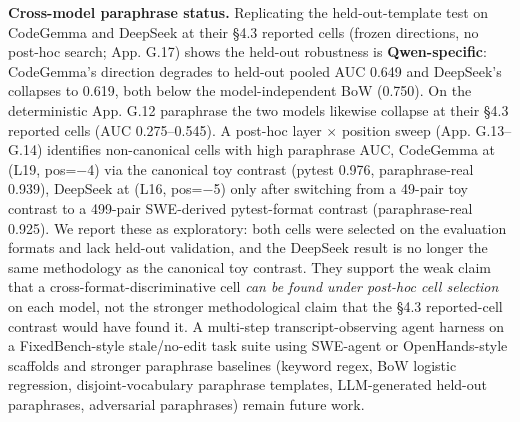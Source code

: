 \documentclass[
  11pt,
  a4paper]{article}
\begin{document}
\textbf{Cross-model paraphrase status.} Replicating the
held-out-template test on CodeGemma and DeepSeek at their \S{}4.3 reported
cells (frozen directions, no post-hoc search; App. G.17) shows the
held-out robustness is \textbf{Qwen-specific}: CodeGemma's direction
degrades to held-out pooled AUC 0.649 and DeepSeek's collapses to 0.619,
both below the model-independent BoW (0.750). On the deterministic App.
G.12 paraphrase the two models likewise collapse at their \S{}4.3 reported
cells (AUC 0.275--0.545). A post-hoc layer \ensuremath{\times} position sweep (App.
G.13--G.14) identifies non-canonical cells with high paraphrase AUC,
CodeGemma at (L19, pos=\ensuremath{-}4) via the canonical toy contrast (pytest 0.976,
paraphrase-real 0.939), DeepSeek at (L16, pos=\ensuremath{-}5) only after switching
from a 49-pair toy contrast to a 499-pair SWE-derived pytest-format
contrast (paraphrase-real 0.925). We report these as exploratory: both
cells were selected on the evaluation formats and lack held-out
validation, and the DeepSeek result is no longer the same methodology as
the canonical toy contrast. They support the weak claim that a
cross-format-discriminative cell \emph{can be found under post-hoc cell
selection} on each model, not the stronger methodological claim that the
\S{}4.3 reported-cell contrast would have found it. A multi-step
transcript-observing agent harness on a FixedBench-style stale/no-edit
task suite using SWE-agent or OpenHands-style scaffolds and stronger
paraphrase baselines (keyword regex, BoW logistic regression,
disjoint-vocabulary paraphrase templates, LLM-generated held-out
paraphrases, adversarial paraphrases) remain future work.
\end{document}
